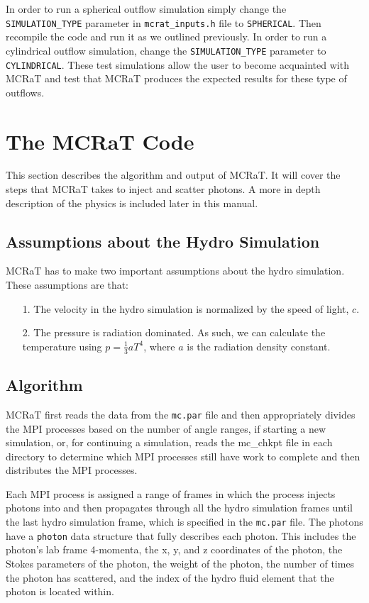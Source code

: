\documentclass[12pt,a4paper]{article}
\begin{document}
 In order to run a spherical outflow simulation simply change the \texttt{SIMULATION\_TYPE} parameter in \texttt{mcrat\_inputs.h} file to \texttt{SPHERICAL}. Then recompile the code and run it as we outlined previously. In order to run a cylindrical outflow simulation, change the \texttt{SIMULATION\_TYPE} parameter to \texttt{CYLINDRICAL}. These test simulations allow the user to become acquainted with MCRaT and test that MCRaT produces the expected results for these type of outflows.
 

\section{The MCRaT Code}
This section describes the algorithm and output of MCRaT. It will cover the steps that MCRaT takes to inject and scatter photons. A more in depth description of the physics is included later in this manual.

\subsection{Assumptions about the Hydro Simulation}
MCRaT has to make two important assumptions about the hydro simulation. These assumptions are that:
\begin{itemize}
\item[1.] The velocity in the hydro simulation is normalized by the speed of light, $c$. 
\item[2.] The pressure is radiation dominated. As such, we can calculate the temperature using $p=\frac{1}{3}aT^4$, where $a$ is the radiation density constant.
\end{itemize}

\subsection{Algorithm}\label{algorithm}

MCRaT first reads the data from the \texttt{mc.par} file and then appropriately divides the MPI processes based on the number of angle ranges, if starting a new simulation, or, for continuing a simulation, reads the mc\_chkpt file in each directory to determine which MPI processes still have work to complete and then distributes the MPI processes. 

Each MPI process is assigned a range of frames in which the process injects photons into and then propagates through all the hydro simulation frames until the last hydro simulation frame, which is specified in the \texttt{mc.par} file. The photons have a \texttt{photon} data structure that fully describes each photon. This includes the photon's lab frame 4-momenta, the x, y, and z coordinates of the photon, the Stokes parameters of the photon, the weight of the photon, the number of times the photon has scattered, and the index of the hydro fluid element that the photon is located within.
\end{document}
